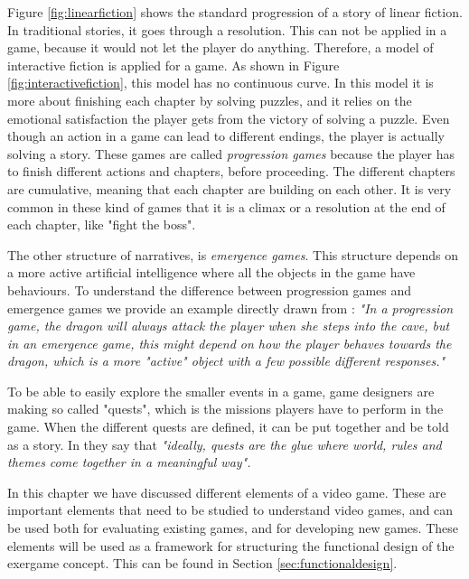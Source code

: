 Figure \ref{fig:linearfiction} shows the standard progression of a story of linear fiction. In traditional stories, it goes through a resolution. This can not be applied in a game, because it would not let the player do anything. Therefore, a model of interactive fiction is applied for a game. As shown in Figure \ref{fig:interactivefiction}, this model has no continuous curve. In this model it is more about finishing each chapter by solving puzzles, and it relies on the emotional satisfaction the player gets from the victory of solving a puzzle. Even though an action in a game can lead to different endings, the player is actually solving a story. These games are called \emph{progression games} because the player has to finish different actions and chapters, before proceeding. The different chapters are cumulative, meaning that each chapter are building on each other. It is very common in these kind of games that it is a climax or a resolution at the end of each chapter, like "fight the boss". 

The other structure of narratives, is \emph{emergence games}. This structure depends on a more active artificial intelligence where all the objects in the game have behaviours. To understand the difference between progression games and emergence games we provide an example directly drawn from \cite{understandingvg}: \emph{"In a progression game, the dragon will always attack the player when she steps into the cave, but in an emergence game, this might depend on how the player behaves towards the dragon, which is a more "active" object with a few possible different responses."} 

To be able to easily explore the smaller events in a game, game designers are making so called "quests", which is the missions players have to perform in the game. When the different quests are defined, it can be put together and be told as a story. In \cite{understandingvg} they say that \emph{"ideally, quests are the glue where world, rules and themes come together in a meaningful way".}

In this chapter we have discussed different elements of a video game. These are important elements that need to be studied to understand video games, and can be used both for evaluating existing games, and for developing new games. These elements will be used as a framework for structuring the functional design of the exergame concept. This can be found in Section \ref{sec:functionaldesign}.

